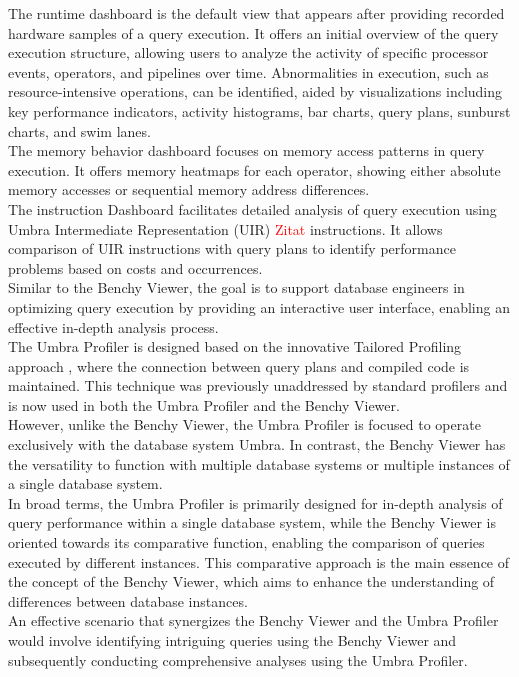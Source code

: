 \noindent 
The runtime dashboard is the default view that appears after providing recorded hardware samples of a query execution. It offers an initial overview of the query execution structure, allowing users to analyze the activity of specific processor events, operators, and pipelines over time. Abnormalities in execution, such as resource-intensive operations, can be identified, aided by visualizations including key performance indicators, activity histograms, bar charts, query plans, sunburst charts, and swim lanes.
\\The memory behavior dashboard focuses on memory access patterns in query execution. It offers memory heatmaps for each operator, showing either absolute memory accesses or sequential memory address differences.
\\The instruction Dashboard facilitates detailed analysis of query execution using Umbra Intermediate Representation (UIR) \textcolor{red}{Zitat} instructions. It allows comparison of UIR instructions with query plans to identify performance problems based on costs and occurrences. 
\\Similar to the Benchy Viewer, the goal is to support database engineers in optimizing query execution by providing an interactive user interface, enabling an effective in-depth analysis process. 
\\The Umbra Profiler is designed based on the innovative Tailored Profiling approach \cite{profiling-dataflow}, where the connection between query plans and compiled code is maintained. This technique was previously unaddressed by standard profilers and is now used in both the Umbra Profiler and the Benchy Viewer.  
\\However, unlike the Benchy Viewer, the Umbra Profiler is focused to operate exclusively with the database system Umbra. In contrast, the Benchy Viewer has the versatility to function with multiple database systems or multiple instances of a single database system.
\\In broad terms, the Umbra Profiler is primarily designed for in-depth analysis of query performance within a single database system, while the Benchy Viewer is oriented towards its comparative function, enabling the comparison of queries executed by different instances. This comparative approach is the main essence  of the concept of the Benchy Viewer, which aims to enhance the understanding of differences between database instances.
\\An effective scenario that synergizes the Benchy Viewer and the Umbra Profiler would involve identifying intriguing queries using the Benchy Viewer and subsequently conducting comprehensive analyses using the Umbra Profiler.


